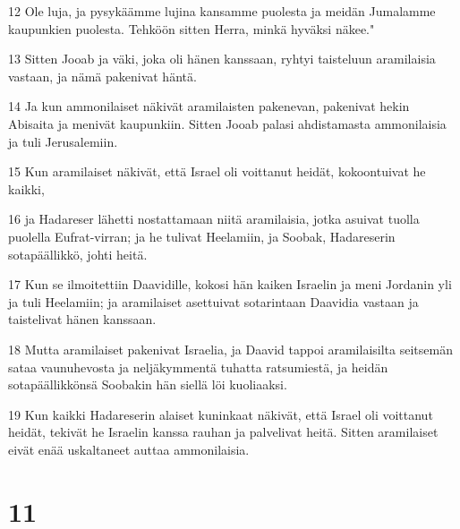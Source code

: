 \par 12 Ole luja, ja pysykäämme lujina kansamme puolesta ja meidän Jumalamme kaupunkien puolesta. Tehköön sitten Herra, minkä hyväksi näkee."
\par 13 Sitten Jooab ja väki, joka oli hänen kanssaan, ryhtyi taisteluun aramilaisia vastaan, ja nämä pakenivat häntä.
\par 14 Ja kun ammonilaiset näkivät aramilaisten pakenevan, pakenivat hekin Abisaita ja menivät kaupunkiin. Sitten Jooab palasi ahdistamasta ammonilaisia ja tuli Jerusalemiin.
\par 15 Kun aramilaiset näkivät, että Israel oli voittanut heidät, kokoontuivat he kaikki,
\par 16 ja Hadareser lähetti nostattamaan niitä aramilaisia, jotka asuivat tuolla puolella Eufrat-virran; ja he tulivat Heelamiin, ja Soobak, Hadareserin sotapäällikkö, johti heitä.
\par 17 Kun se ilmoitettiin Daavidille, kokosi hän kaiken Israelin ja meni Jordanin yli ja tuli Heelamiin; ja aramilaiset asettuivat sotarintaan Daavidia vastaan ja taistelivat hänen kanssaan.
\par 18 Mutta aramilaiset pakenivat Israelia, ja Daavid tappoi aramilaisilta seitsemän sataa vaunuhevosta ja neljäkymmentä tuhatta ratsumiestä, ja heidän sotapäällikkönsä Soobakin hän siellä löi kuoliaaksi.
\par 19 Kun kaikki Hadareserin alaiset kuninkaat näkivät, että Israel oli voittanut heidät, tekivät he Israelin kanssa rauhan ja palvelivat heitä. Sitten aramilaiset eivät enää uskaltaneet auttaa ammonilaisia.

\chapter{11}

